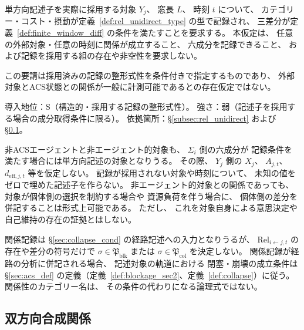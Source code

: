 \begin{assumption}[単方向関係記述の対象範囲]
\label{ass:unidirect_scope}
単方向記述子を実際に採用する対象 $Y_j$、
窓長 $L$、
時刻 $t$ について、
カテゴリー・コスト・摂動が定義~\ref{def:rel_unidirect_type} の型で記録され、
三差分が定義~\ref{def:finite_window_diff} の条件を満たすことを要求する。
本仮定は、
任意の外部対象・任意の時刻に関係が成立すること、
六成分を記録できること、
および記録を採用する組の存在や非空性を要求しない。

この要請は採用済みの記録の整形式性を条件付きで指定するものであり、
外部対象とACS状態との関係が一般に計測可能であるとの存在仮定ではない。

導入地位：S（構造的・採用する記録の整形式性）。
強さ：弱（記述子を採用する場合の成分取得条件に限る）。
依拠箇所：\S\ref{subsec:rel_unidirect} および \S\ref{subsec:rel_bidirect}。
\end{assumption}

\begin{remark}[非ACS対象への適用]
\label{rem:unidirect_nonacs}
非ACSエージェントと非エージェント的対象も、
$\Sigma_i$ 側の六成分が
記録条件を満たす場合には単方向記述の対象となりうる。
その際、
$Y_j$ 側の $X_j$、
$A_{j,t}$、
$d_{\mathrm{eff},j,t}$ 等を仮定しない。
記録が採用されない対象や時刻について、
未知の値をゼロで埋めた記述子を作らない。
非エージェント的対象との関係であっても、
対象が個体側の選択を制約する場合や
資源負荷を伴う場合に、
個体側の差分を併記することは形式上可能である。
ただし、
これを対象自身による意思決定や自己維持の存在の証拠とはしない。
\end{remark}

\begin{remark}[閉塞・崩壊の節への接続]
\label{rem:to_section7}
関係記録は \S\ref{sec:collapse_cond} の経路記述への入力となりうるが、
$\mathrm{Rel}_{i\leftarrow j,t}$ の存在や差分の符号だけで
$\sigma\in\mathfrak{P}_{\mathrm{blk}}$ または
$\sigma\in\mathfrak{P}_{\mathrm{col}}$ を決定しない。
関係記録が経路の分析に併記される場合、
記述対象の軌道における
閉塞・崩壊の成立条件は \S\ref{sec:acs_def} の定義（定義~\ref{def:blockage_sec2}、定義~\ref{def:collapse}）に従う。
関係性のカテゴリー名は、
その条件の代わりになる論理式ではない。
\end{remark}

\subsection{双方向合成関係}
\label{subsec:rel_bidirect}

